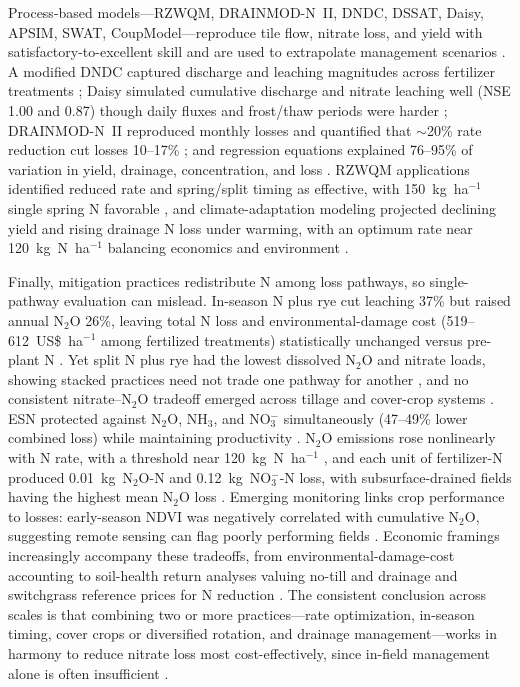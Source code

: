 Process-based models---RZWQM, DRAINMOD-N~II, DNDC, DSSAT, Daisy, APSIM, SWAT, CoupModel---reproduce tile flow, nitrate loss, and yield with satisfactory-to-excellent skill and are used to extrapolate management scenarios \parencite{Jeong2018,Ahmed2007b,Ale2012b,Pasley2021,Motarjemi2021,Conrad2009}. A modified DNDC captured discharge and leaching magnitudes across fertilizer treatments \parencite{Li2006}; Daisy simulated cumulative discharge and nitrate leaching well (NSE 1.00 and 0.87) though daily fluxes and frost/thaw periods were harder \parencite{Motarjemi2021}; DRAINMOD-N~II reproduced monthly losses and quantified that $\sim$20\% rate reduction cut losses 10--17\% \parencite{Ale2012b}; and regression equations explained 76--95\% of variation in yield, drainage, concentration, and loss \parencite{Malone2007}. RZWQM applications identified reduced rate and spring/split timing as effective, with 150~kg~ha$^{-1}$ single spring N favorable \parencite{Azevedo1997,Malone2007b}, and climate-adaptation modeling projected declining yield and rising drainage N loss under warming, with an optimum rate near 120~kg~N~ha$^{-1}$ balancing economics and environment \parencite{Wang2016b}.

Finally, mitigation practices redistribute N among loss pathways, so single-pathway evaluation can mislead. In-season N plus rye cut leaching 37\% but raised annual N$_2$O 26\%, leaving total N loss and environmental-damage cost (519--612~US\$~ha$^{-1}$ among fertilized treatments) statistically unchanged versus pre-plant N \parencite{PrezaFontes2023}. Yet split N plus rye had the lowest dissolved N$_2$O and nitrate loads, showing stacked practices need not trade one pathway for another \parencite{Oliveira2025}, and no consistent nitrate--N$_2$O tradeoff emerged across tillage and cover-crop systems \parencite{OBrien2022}. ESN protected against N$_2$O, NH$_3$, and NO$_3^-$ simultaneously (47--49\% lower combined loss) while maintaining productivity \parencite{Menegaz2025}. N$_2$O emissions rose nonlinearly with N rate, with a threshold near 120~kg~N~ha$^{-1}$ \parencite{Wang2016b}, and each unit of fertilizer-N produced 0.01~kg~N$_2$O-N and 0.12~kg~NO$_3^-$-N loss, with subsurface-drained fields having the highest mean N$_2$O loss \parencite{Chatterjee2020b}. Emerging monitoring links crop performance to losses: early-season NDVI was negatively correlated with cumulative N$_2$O, suggesting remote sensing can flag poorly performing fields \parencite{Fontes2019}. Economic framings increasingly accompany these tradeoffs, from environmental-damage-cost accounting \parencite{PrezaFontes2023} to soil-health return analyses valuing no-till and drainage \parencite{Cassman2025} and switchgrass reference prices for N reduction \parencite{Woodbury2018}. The consistent conclusion across scales is that combining two or more practices---rate optimization, in-season timing, cover crops or diversified rotation, and drainage management---works in harmony to reduce nitrate loss most cost-effectively, since in-field management alone is often insufficient \parencite{Dinnes2002,Singh2023}.